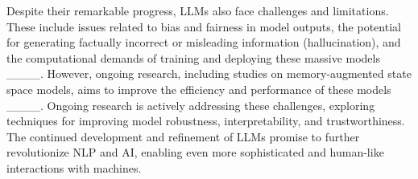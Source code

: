 Despite their remarkable progress, LLMs also face challenges and limitations. These include issues related to bias and fairness in model outputs, the potential for generating factually incorrect or misleading information (hallucination), and the computational demands of training and deploying these massive models ____.  However, ongoing research, including studies on memory-augmented state space models, aims to improve the efficiency and performance of these models ____. Ongoing research is actively addressing these challenges, exploring techniques for improving model robustness, interpretability, and trustworthiness. The continued development and refinement of LLMs promise to further revolutionize NLP and AI, enabling even more sophisticated and human-like interactions with machines.